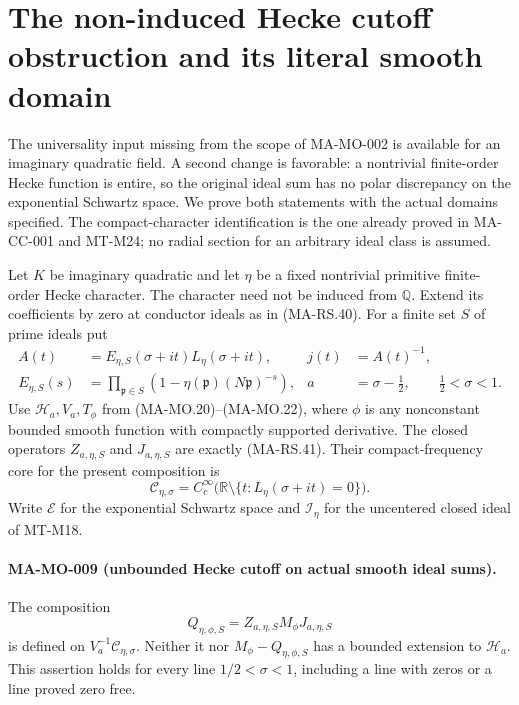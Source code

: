 \section{The non-induced Hecke cutoff obstruction and its literal smooth domain}
\label{sec:hecke-cutoff-obstruction}

The universality input missing from the scope of MA-MO-002 is
available for an imaginary quadratic field. A second change is
favorable: a nontrivial finite-order Hecke function is entire, so
the original ideal sum has no polar discrepancy on the exponential
Schwartz space. We prove both statements with the actual domains
specified. The compact-character identification is the one already
proved in MA-CC-001 and MT-M24; no radial section for an arbitrary
ideal class is assumed.

Let \(K\) be imaginary quadratic and let \(\eta\) be a fixed
nontrivial primitive finite-order Hecke character. The character
need not be induced from \(\mathbb Q\). Extend its coefficients
by zero at conductor ideals as in (MA-RS.40). For a finite set
\(S\) of prime ideals put
\[
 \begin{aligned}
 A(t)&=E_{\eta,S}(\sigma+it)L_\eta(\sigma+it),
       &j(t)&=A(t)^{-1},\\
 E_{\eta,S}(s)&=\prod_{\mathfrak p\in S}
             (1-\eta(\mathfrak p)(N\mathfrak p)^{-s}),
       &a&=\sigma-\tfrac12,\qquad \tfrac12<\sigma<1.
 \end{aligned}
 \tag{MA-MO.100}
\]
Use \(\mathcal H_a,V_a,T_\phi\) from (MA-MO.20)--(MA-MO.22),
where \(\phi\) is any nonconstant bounded smooth function with
compactly supported derivative. The closed operators
\(Z_{a,\eta,S}\) and \(J_{a,\eta,S}\) are exactly (MA-RS.41).
Their compact-frequency core for the present composition is
\[
 \mathscr C_{\eta,\sigma}
 =C_c^\infty\bigl(\mathbb R\setminus
                  \{t:L_\eta(\sigma+it)=0\}\bigr).
 \tag{MA-MO.101}
\]
Write \(\mathcal E\) for the exponential Schwartz space and
\(\mathcal I_\eta\) for the uncentered closed ideal of MT-M18.

\paragraph{MA-MO-009 (unbounded Hecke cutoff on actual smooth ideal sums).}
The composition
\[
 Q_{\eta,\phi,S}=Z_{a,\eta,S}M_\phi J_{a,\eta,S}
 \tag{MA-MO.102}
\]
is defined on \(V_a^{-1}\mathscr C_{\eta,\sigma}\).
Neither it nor \(M_\phi-Q_{\eta,\phi,S}\) has a bounded
extension to \(\mathcal H_a\). This assertion holds for every
line \(1/2<\sigma<1\), including a line with zeros or a line
proved zero free.

